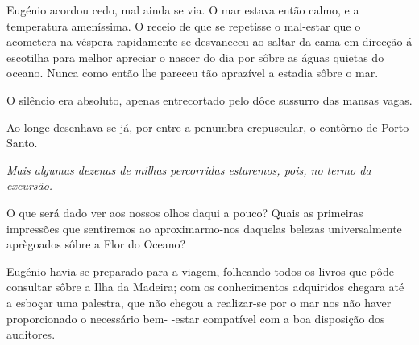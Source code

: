 \documentclass[9pt]{article}
\begin{document}
Eugé\-nio acordou cedo, mal ainda se via. O mar estava então calmo, e a temperatura ameníssima. O receio de que se repetisse o mal-estar que o acometera
na véspera rapidamente se desvaneceu ao saltar da cama em direc\-ção á escoti\-lha
para me\-lhor apreciar o nascer do dia por sôbre as águas quietas do oceano. Nunca como então lhe pareceu tão aprazível a estadia sôbre o mar.

O silêncio era absoluto, apenas entrecortado pelo dôce sussurro das mansas
vagas.

Ao longe desenhava-se já, por entre a penumbra crepuscular, o con\-tôr\-no de
Porto Santo. {\em Mais algumas dezenas de mi\-lhas percorridas estaremos, pois, no termo da excursão.

O que será dado ver aos nossos o\-lhos daqui a pouco? Quais as primeiras
im\-pres\-sões que sentiremos ao a\-pro\-xi\-marmo-nos daquelas belezas universalmente
aprègoados sôbre a Flor do Oceano?}

Eugé\-nio havia-se preparado para a viagem, fo\-lheando todos os livros que
pôde consultar sôbre a I\-lha da Madeira; com os conhecimentos adquiridos chegara até a esboçar uma palestra, que não chegou a realizar-se por o mar nos não
haver proporcionado o necessário bem- -estar compatível com a boa disposi\-ção %
dos auditores.
\end{document}
